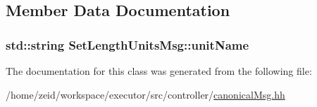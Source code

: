 \subsection{Member Data Documentation}
\hypertarget{class_set_length_units_msg_a7fa8c81ab5a179b1612f4996708cda50}{
\subsubsection[{unitName}]{\setlength{\rightskip}{0pt plus 5cm}std::string {\bf SetLengthUnitsMsg::unitName}}}
\label{class_set_length_units_msg_a7fa8c81ab5a179b1612f4996708cda50}


The documentation for this class was generated from the following file:\begin{DoxyCompactItemize}
\item 
/home/zeid/workspace/executor/src/controller/\hyperlink{canonical_msg_8hh}{canonicalMsg.hh}\end{DoxyCompactItemize}
